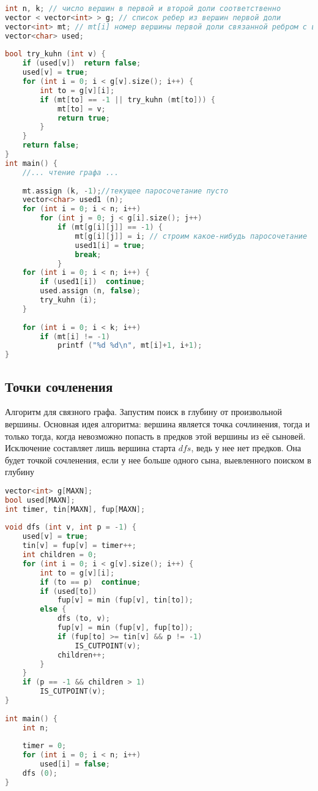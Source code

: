 \begin{lstlisting}[language=C++]
int n, k; // число вершин в первой и второй доли соответственно
vector < vector<int> > g; // список ребер из вершин первой доли
vector<int> mt; // mt[i] номер вершины первой доли связанной ребром с вершиной второй доли под номером i
vector<char> used;
 
bool try_kuhn (int v) {
	if (used[v])  return false;
	used[v] = true;
	for (int i = 0; i < g[v].size(); i++) {
		int to = g[v][i];
		if (mt[to] == -1 || try_kuhn (mt[to])) {
			mt[to] = v;
			return true;
		}
	}
	return false;
}
int main() {
	//... чтение графа ...
 
	mt.assign (k, -1);//текущее паросочетание пусто
	vector<char> used1 (n);
	for (int i = 0; i < n; i++)
		for (int j = 0; j < g[i].size(); j++)
			if (mt[g[i][j]] == -1) {
				mt[g[i][j]] = i; // строим какое-нибудь паросочетание
				used1[i] = true;
				break;
			}
	for (int i = 0; i < n; i++) {
		if (used1[i])  continue;
		used.assign (n, false);
		try_kuhn (i);
	}
 
	for (int i = 0; i < k; i++)
		if (mt[i] != -1)
			printf ("%d %d\n", mt[i]+1, i+1);
}
\end{lstlisting}
\subsection{Точки сочленения}
Алгоритм для связного графа. Запустим поиск в глубину от произвольной вершины. Основная идея алгоритма: вершина является точка сочлинения, тогда и только тогда, когда невозможно попасть в предков этой вершины из её сыновей. Исключение составляет лишь вершина старта $dfs$, ведь у нее нет предков. Она будет точкой сочленения, если у нее больше одного сына, выевленного поиском в глубину
\begin{lstlisting}[language=C++]
vector<int> g[MAXN];
bool used[MAXN];
int timer, tin[MAXN], fup[MAXN];
 
void dfs (int v, int p = -1) {
	used[v] = true;
	tin[v] = fup[v] = timer++;
	int children = 0;
	for (int i = 0; i < g[v].size(); i++) {
		int to = g[v][i];
		if (to == p)  continue;
		if (used[to])
			fup[v] = min (fup[v], tin[to]);
		else {
			dfs (to, v);
			fup[v] = min (fup[v], fup[to]);
			if (fup[to] >= tin[v] && p != -1)
				IS_CUTPOINT(v);
			children++;
		}
	}
	if (p == -1 && children > 1)
		IS_CUTPOINT(v);
}
 
int main() {
	int n;
 
	timer = 0;
	for (int i = 0; i < n; i++)
		used[i] = false;
	dfs (0);
}
\end{lstlisting}
